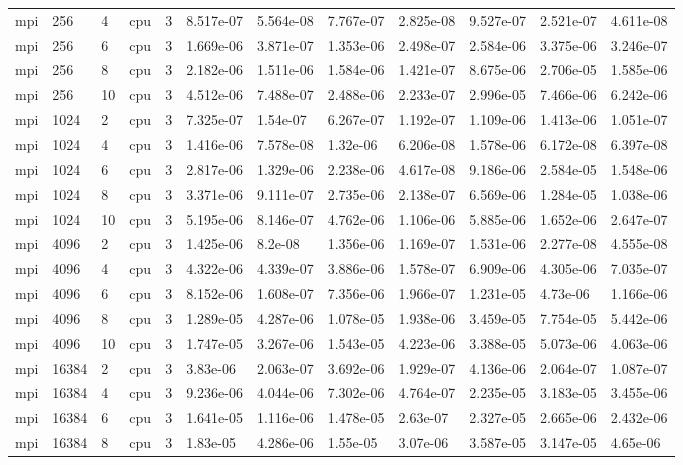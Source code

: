 \begin{tabular}{llllllllllll}
mpi & 256 & 4 & cpu & 3 & 8.517e-07 & 5.564e-08 & 7.767e-07 & 2.825e-08 & 9.527e-07 & 2.521e-07 & 4.611e-08 \\
mpi & 256 & 6 & cpu & 3 & 1.669e-06 & 3.871e-07 & 1.353e-06 & 2.498e-07 & 2.584e-06 & 3.375e-06 & 3.246e-07 \\
mpi & 256 & 8 & cpu & 3 & 2.182e-06 & 1.511e-06 & 1.584e-06 & 1.421e-07 & 8.675e-06 & 2.706e-05 & 1.585e-06 \\
mpi & 256 & 10 & cpu & 3 & 4.512e-06 & 7.488e-07 & 2.488e-06 & 2.233e-07 & 2.996e-05 & 7.466e-06 & 6.242e-06 \\
mpi & 1024 & 2 & cpu & 3 & 7.325e-07 & 1.54e-07 & 6.267e-07 & 1.192e-07 & 1.109e-06 & 1.413e-06 & 1.051e-07 \\
mpi & 1024 & 4 & cpu & 3 & 1.416e-06 & 7.578e-08 & 1.32e-06 & 6.206e-08 & 1.578e-06 & 6.172e-08 & 6.397e-08 \\
mpi & 1024 & 6 & cpu & 3 & 2.817e-06 & 1.329e-06 & 2.238e-06 & 4.617e-08 & 9.186e-06 & 2.584e-05 & 1.548e-06 \\
mpi & 1024 & 8 & cpu & 3 & 3.371e-06 & 9.111e-07 & 2.735e-06 & 2.138e-07 & 6.569e-06 & 1.284e-05 & 1.038e-06 \\
mpi & 1024 & 10 & cpu & 3 & 5.195e-06 & 8.146e-07 & 4.762e-06 & 1.106e-06 & 5.885e-06 & 1.652e-06 & 2.647e-07 \\
mpi & 4096 & 2 & cpu & 3 & 1.425e-06 & 8.2e-08 & 1.356e-06 & 1.169e-07 & 1.531e-06 & 2.277e-08 & 4.555e-08 \\
mpi & 4096 & 4 & cpu & 3 & 4.322e-06 & 4.339e-07 & 3.886e-06 & 1.578e-07 & 6.909e-06 & 4.305e-06 & 7.035e-07 \\
mpi & 4096 & 6 & cpu & 3 & 8.152e-06 & 1.608e-07 & 7.356e-06 & 1.966e-07 & 1.231e-05 & 4.73e-06 & 1.166e-06 \\
mpi & 4096 & 8 & cpu & 3 & 1.289e-05 & 4.287e-06 & 1.078e-05 & 1.938e-06 & 3.459e-05 & 7.754e-05 & 5.442e-06 \\
mpi & 4096 & 10 & cpu & 3 & 1.747e-05 & 3.267e-06 & 1.543e-05 & 4.223e-06 & 3.388e-05 & 5.073e-06 & 4.063e-06 \\
mpi & 16384 & 2 & cpu & 3 & 3.83e-06 & 2.063e-07 & 3.692e-06 & 1.929e-07 & 4.136e-06 & 2.064e-07 & 1.087e-07 \\
mpi & 16384 & 4 & cpu & 3 & 9.236e-06 & 4.044e-06 & 7.302e-06 & 4.764e-07 & 2.235e-05 & 3.183e-05 & 3.455e-06 \\
mpi & 16384 & 6 & cpu & 3 & 1.641e-05 & 1.116e-06 & 1.478e-05 & 2.63e-07 & 2.327e-05 & 2.665e-06 & 2.432e-06 \\
mpi & 16384 & 8 & cpu & 3 & 1.83e-05 & 4.286e-06 & 1.55e-05 & 3.07e-06 & 3.587e-05 & 3.147e-05 & 4.65e-06 \\

\end{tabular}
